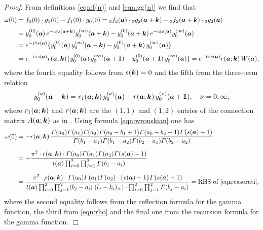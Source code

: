 \documentclass[a4paper,12pt]{article}
\theoremstyle{plain}
\def\vG{\varGamma}
\def\ba{\mbox{\boldmath $a$}}
\def\sba{\mbox{\boldmath ${\scriptstyle a}$}}
\def\bk{\mbox{\boldmath $k$}}
\def\sbk{\mbox{\boldmath ${\scriptstyle k}$}}
\def\1{\mbox{\boldmath $1$}}
\begin{document}
{\it Proof}.  
From definitions \eqref{eqn:f(n)} and \eqref{eqn:gg(n)} we find that  
\begin{align*}
\omega(0) 
&= f_0(0) \cdot g_1(0) - f_1(0) \cdot g_0(0) 
= {}_3f_2(\ba) \cdot {}_3g_2(\ba + \bk) -  {}_3f_2(\ba + \bk) \cdot {}_3g_2(\ba) \\[1mm]
&= y_0^{(0)}(\ba) \, e^{-\mathrm{i} \pi s(\sba+\sbk)} y_0^{(\infty)}(\ba+\bk) 
- y_0^{(0)}(\ba+\bk) \, e^{-\mathrm{i} \pi s(\sba)} y_0^{(\infty)}(\ba) \\
&=  e^{-\mathrm{i} \pi s(\sba)} \{ y_0^{(0)}(\ba) \, y_0^{(\infty)}(\ba+\bk) 
- y_0^{(0)}(\ba+\bk) \, y_0^{(\infty)}(\ba) \} \\[1mm]
&=  e^{-\mathrm{i} \pi s(\sba)} r(\ba; \bk) 
\{ y_0^{(0)}(\ba) \, y_0^{(\infty)}(\ba+\1) - y_0^{(0)}(\ba+\1) \, y_0^{(\infty)}(\ba) \} 
= e^{-\mathrm{i} \pi s(\sba)} r(\ba; \bk) \, W(\ba), 
\end{align*}
where the fourth equality follows from $s(\bk) = 0$ and the fifth from the 
three-term relation 
\[
y_0^{(\nu)}(\ba+\bk) = r_1(\ba; \bk) \, y_0^{(\nu)}(\ba) + 
r(\ba; \bk) \, y_0^{(\nu)}(\ba+\1), \quad \nu = 0, \infty, 
\]
where $r_1(\ba; \bk)$ and $r(\ba; \bk)$ are the $(1, 1)$ and $(1, 2)$ entries 
of  the connection matrix $A(\ba; \bk)$ as in \cite[formulas (33) and (34)]{EI}.  
Using formula \eqref{eqn:wronskian} one has  
\begin{align*} 
\omega(0) 
&= - r(\ba; \bk) \, \dfrac{\vG(a_0) \vG(a_1) \vG(a_2) \vG(a_0-b_1+1) 
\vG(a_0-b_2+1) \vG(s(\ba)-1)}{\vG(b_1-a_1) \vG(b_1-a_2) 
\vG(b_2-a_1) \vG(b_2-a_2) } \\[2mm]
&= - \dfrac{ \pi^2 \cdot r(\ba; \bk) \cdot \vG(a_0) \vG(a_1) \vG(a_2) 
\vG(s(\ba)-1) }{ t(\ba) \prod_{i=0}^2 \prod_{j=1}^2 \vG(b_j-a_i) }  \\[2mm]
&= \dfrac{ \pi^2 \cdot \rho(\ba; \bk) \cdot \vG(a_0) \vG(a_1) \vG(a_2) \cdot 
\{ s(\ba)-1 \} \vG(s(\ba)-1) }{ t(\ba)  
 \prod_{i=0}^2 \prod_{j=1}^2 (b_j - a_i; \, (l_j-k_i)_+) \cdot 
\prod_{i=0}^2 \prod_{j=1}^2 \vG(b_j-a_i) }  = \mbox{RHS of \eqref{eqn:casorati}},  
\end{align*}
where the second equality follows from the reflection formula for the gamma 
function, the third from \eqref{eqn:rho} and the final one from the recursion 
formula for the gamma function. \hfill $\Box$ 
\end{document}
